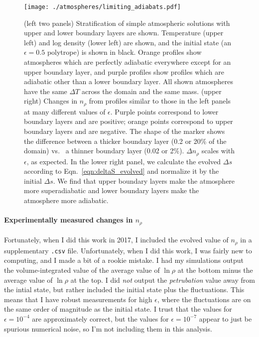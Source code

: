 \documentclass[aps, pre, onecolumn, nofootinbib, notitlepage, groupedaddress, amsfonts, amssymb, amsmath, longbibliography, superscriptaddress]{revtex4-1}
\begin{document}
\begin{figure}[t!]
\texttt{[image: ./atmospheres/limiting\_adiabats.pdf]}
\caption{ (left two panels) Stratification of simple atmospheric solutions with upper and lower boundary layers are shown.
		  Temperature (upper left) and log density (lower left) are shown, and the initial state (an $\epsilon = 0.5$ polytrope) is shown in black.
		  Orange profiles show atmospheres which are perfectly adiabatic everywhere except for an upper boundary layer, and purple profiles show profiles which are adiabatic other than a lower boundary layer.
		  All shown atmospheres have the same $\Delta T$ across the domain and the same mass.
		  (upper right) Changes in $n_\rho$ from profiles similar to those in the left panels at many different values of $\epsilon$.
		  Purple points correspond to lower boundary layers and are positive; orange points correspond to upper boundary layers and are negative.
		  The shape of the marker shows the difference between a thicker boundary layer (0.2 or 20\% of the domain) vs.~ a thinner boundary layer (0.02 or 2\%).
		  $\Delta n_\rho$ scales with $\epsilon$, as expected.
		  In the lower right panel, we calculate the evolved $\Delta s$ according to Eqn.~\ref{eqn:deltaS_evolved} and normalize it by the initial $\Delta s$.
		  We find that upper boundary layers make the atmosphere more superadiabatic and lower boundary layers make the atmosphere more adiabatic.
	\label{fig:limiting_adiabats} }
\end{figure}

\paragraph{Experimentally measured changes in $n_\rho$}
Fortunately, when I did this work in 2017, I included the evolved value of $n_\rho$ in a supplementary \texttt{.csv} file.
Unfortunately, when I did this work, I was fairly new to computing, and I made a bit of a rookie mistake.
I had my simulations output the volume-integrated value of the average value of $\ln\rho$ at the bottom minus the average value of $\ln\rho$ at the top.
I did \emph{not} output the \emph{petrubation} value away from the intial state, but rather included the initial state plus the fluctuations.
This means that I have robust measurements for high $\epsilon$, where the fluctuations are on the same order of magnitude as the initial state.
I trust that the values for $\epsilon = 10^{-4}$ are approximately correct, but the values for $\epsilon = 10^{-7}$ appear to just be spurious numerical noise, so I'm not including them in this analysis.
\end{document}

